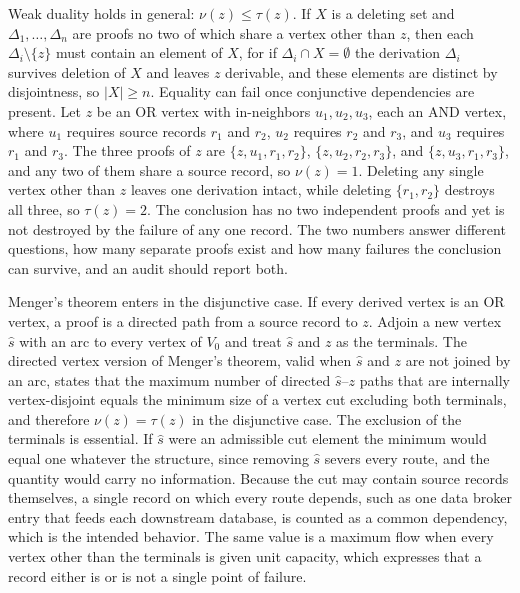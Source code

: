 \documentclass[11pt]{article}
\theoremstyle{definition}
\theoremstyle{remark}
\begin{document}
Weak duality holds in general: $\nu(z) \le \tau(z)$. If $X$ is a deleting set and $\Delta_1, \ldots, \Delta_n$ are proofs no two of which share a vertex other than $z$, then each $\Delta_i \setminus \{z\}$ must contain an element of $X$, for if $\Delta_i \cap X = \emptyset$ the derivation $\Delta_i$ survives deletion of $X$ and leaves $z$ derivable, and these elements are distinct by disjointness, so $|X| \ge n$. Equality can fail once conjunctive dependencies are present. Let $z$ be an OR vertex with in-neighbors $u_1, u_2, u_3$, each an AND vertex, where $u_1$ requires source records $r_1$ and $r_2$, $u_2$ requires $r_2$ and $r_3$, and $u_3$ requires $r_1$ and $r_3$. The three proofs of $z$ are $\{z,u_1,r_1,r_2\}$, $\{z,u_2,r_2,r_3\}$, and $\{z,u_3,r_1,r_3\}$, and any two of them share a source record, so $\nu(z) = 1$. Deleting any single vertex other than $z$ leaves one derivation intact, while deleting $\{r_1,r_2\}$ destroys all three, so $\tau(z) = 2$. The conclusion has no two independent proofs and yet is not destroyed by the failure of any one record. The two numbers answer different questions, how many separate proofs exist and how many failures the conclusion can survive, and an audit should report both.

Menger's theorem enters in the disjunctive case. If every derived vertex is an OR vertex, a proof is a directed path from a source record to $z$. Adjoin a new vertex $\hat{s}$ with an arc to every vertex of $V_0$ and treat $\hat{s}$ and $z$ as the terminals. The directed vertex version of Menger's theorem, valid when $\hat{s}$ and $z$ are not joined by an arc, states that the maximum number of directed $\hat{s}$--$z$ paths that are internally vertex-disjoint equals the minimum size of a vertex cut excluding both terminals, and therefore $\nu(z) = \tau(z)$ in the disjunctive case. The exclusion of the terminals is essential. If $\hat{s}$ were an admissible cut element the minimum would equal one whatever the structure, since removing $\hat{s}$ severs every route, and the quantity would carry no information. Because the cut may contain source records themselves, a single record on which every route depends, such as one data broker entry that feeds each downstream database, is counted as a common dependency, which is the intended behavior. The same value is a maximum flow when every vertex other than the terminals is given unit capacity, which expresses that a record either is or is not a single point of failure.
\end{document}
